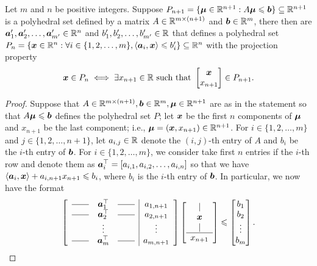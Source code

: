 \begin{theorem}\label{thm: FM}
Let $m$ and $n$ be positive integers. Suppose $P_{n+1} = \{{\boldsymbol\mu}\in\mathbb R^{n+1}: A{\boldsymbol\mu}\leqslant {\boldsymbol b}\}\subseteq \mathbb R^{n+1}$ is a polyhedral set defined by a matrix $ A \in\mathbb R^{m\times (n+1)}$ and ${\boldsymbol b}\in\mathbb R^m$, there then are  ${\boldsymbol a}'_1, {\boldsymbol a}'_2, \dots, {\boldsymbol a}'_{m'}\in \mathbb R^n$ and $b_1', b_2', \dots, b_{m'}'\in\mathbb R$ that defines a polyhedral set $P_n = \{{\boldsymbol x}\in\mathbb R^n:\forall i\in\{1,2,\dots, m\}, \left\langle{\boldsymbol a}_i, {\boldsymbol x}\right\rangle\leqslant b_i'\}\subseteq \mathbb R^n$ with the projection property 
\[ {\boldsymbol x}\in P_n \iff \exists  x_{n+1} \in \mathbb R \text{ such that } \begin{bmatrix}{\boldsymbol x}\\ x_{n+1}\end{bmatrix} \in P_{n+1}.  \]
\end{theorem}
\begin{proof}
Suppose that $A\in\mathbb R^{m\times(n+1)}, {\boldsymbol b}\in\mathbb R^m, {\boldsymbol\mu}\in\mathbb R^{n+1}$ are as in the statement so that $A{\boldsymbol\mu} \leqslant {\boldsymbol b}$ defines the polyhedral set $P$; let ${\boldsymbol x}$ be the first $n$ components of ${\boldsymbol\mu}$ and $x_{n+1}$ be the last component; i.e., ${\boldsymbol\mu} = ({\boldsymbol x}, x_{n+1})\in\mathbb R^{n+1}$. For $i\in\{1,2,\dots, m\}$ and $j\in\{1,2,\dots, n+1\}$, let $a_{i,j}\in\mathbb R$ denote the $(i, j)$-th entry of $A$ and $b_i$ be the $i$-th entry of ${\boldsymbol b}$. For $i\in\{1,2,\dots, m\}$, we consider take first $n$ entries if the $i$-th row and denote them as ${\boldsymbol a}_{i}^\top = [a_{i, 1}, a_{i, 2}, \dots, a_{i, n}]$ so that we have $\left\langle{\boldsymbol a}_i, {\boldsymbol x}\right\rangle + a_{i, n+1} x_{n+1} \leqslant b_i$, where $b_i$ is the $i$-th entry of ${\boldsymbol b}$. In particular, we now have the format
\[ \left[\begin{array}{rcl |c} 
\rule[.5ex]{2em}{.4pt} & \bma_1^\top & \rule[.5ex]{2em}{.4pt} & a_{1, n+1} \\
\rule[.5ex]{2em}{.4pt} & \bma_2^\top & \rule[.5ex]{2em}{.4pt}  & a_{2, n+1} \\
 & \vdots &  & \vdots \\
\rule[.5ex]{2em}{.4pt} & \bma_m^\top & \rule[.5ex]{2em}{.4pt}  & a_{m, n+1}
\end{array}\right]  
\left[\begin{array}{c}
|\\
\bmx \\
|\\\hline
x_{n+1}
\end{array}\right] 
\leq \begin{bmatrix} b_1 \\ b_2\\ \vdots \\ b_{m} \end{bmatrix}.
 \]


\end{proof}
